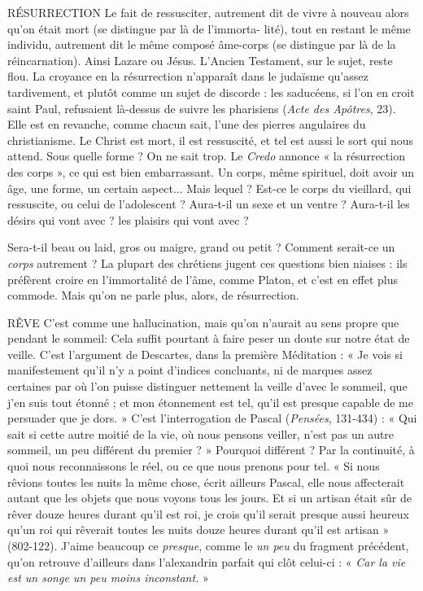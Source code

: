 RÉSURRECTION Le fait de ressusciter, autrement dit de vivre à nouveau
alors qu’on était mort (se distingue par là de l’immorta-
lité), tout en restant le même individu, autrement dit le même composé âme-corps
(se distingue par là de la réincarnation). Ainsi Lazare ou Jésus. L’Ancien
Testament, sur le sujet, reste flou. La croyance en la résurrection n’apparaît
dans le judaïsme qu’assez tardivement, et plutôt comme un sujet de discorde :
les saducéens, si l’on en croit saint Paul, refusaient là-dessus de suivre les pharisiens
({\it Acte des Apôtres}, 23). Elle est en revanche, comme chacun sait, l’une des
pierres angulaires du christianisme. Le Christ est mort, il est ressuscité, et tel est
aussi le sort qui nous attend. Sous quelle forme ? On ne sait trop. Le {\it Credo}
annonce « la résurrection des corps », ce qui est bien embarrassant. Un corps,
même spirituel, doit avoir un âge, une forme, un certain aspect... Mais lequel ?
Est-ce le corps du vieillard, qui ressuscite, ou celui de l’adolescent ? Aura-t-il un
sexe et un ventre ? Aura-t-il les désirs qui vont avec ? les plaisirs qui vont avec ?

Sera-t-il beau ou laid, gros ou maigre, grand ou petit ? Comment serait-ce un
{\it corps} autrement ? La plupart des chrétiens jugent ces questions bien niaises : ils
préfèrent croire en l’immortalité de l’âme, comme Platon, et c’est en effet plus
commode. Mais qu’on ne parle plus, alors, de résurrection.

RÊVE C’est comme une hallucination, mais qu’on n’aurait au sens propre
que pendant le sommeil: Cela suffit pourtant à faire peser un doute
sur notre état de veille. C’est l’argument de Descartes, dans la première
Méditation : « Je vois si manifestement qu’il n’y a point d’indices concluants,
ni de marques assez certaines par où l’on puisse distinguer nettement la veille
d’avec le sommeil, que j’en suis tout étonné ; et mon étonnement est tel, qu’il
est presque capable de me persuader que je dors. » C’est l'interrogation de
Pascal ({\it Pensées}, 131-434) : « Qui sait si cette autre moitié de la vie, où nous
pensons veiller, n’est pas un autre sommeil, un peu différent du premier ? »
Pourquoi différent ? Par la continuité, à quoi nous reconnaissons le réel, ou ce
que nous prenons pour tel. « Si nous rêvions toutes les nuits la même chose,
écrit ailleurs Pascal, elle nous affecterait autant que les objets que nous voyons
tous les jours. Et si un artisan était sûr de rêver douze heures durant qu’il est
roi, je crois qu'il serait presque aussi heureux qu’un roi qui rêverait toutes les
nuits douze heures durant qu’il est artisan » (802-122). J'aime beaucoup ce
{\it presque}, comme le {\it un peu} du fragment précédent, qu’on retrouve d’ailleurs
dans l’alexandrin parfait qui clôt celui-ci : « {\it Car la vie est un songe un peu moins
inconstant.} »

